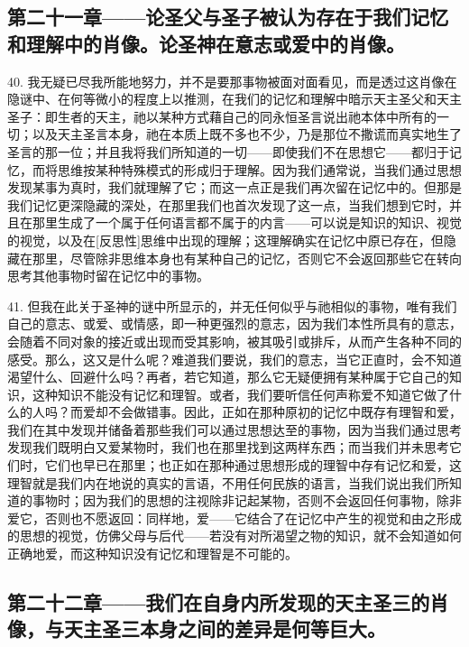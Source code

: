 
\subsection{第二十一章——论圣父与圣子被认为存在于我们记忆和理解中的肖像。论圣神在意志或爱中的肖像。}

40. 我无疑已尽我所能地努力，并不是要那事物被面对面看见，而是透过这肖像在隐谜中、在何等微小的程度上以推测，在我们的记忆和理解中暗示天主圣父和天主圣子：即生者的天主，祂以某种方式藉自己的同永恒圣言说出祂本体中所有的一切；以及天主圣言本身，祂在本质上既不多也不少，乃是那位不撒谎而真实地生了圣言的那一位；并且我将我们所知道的一切——即使我们不在思想它——都归于记忆，而将思维按某种特殊模式的形成归于理解。因为我们通常说，当我们通过思想发现某事为真时，我们就理解了它；而这一点正是我们再次留在记忆中的。但那是我们记忆更深隐藏的深处，在那里我们也首次发现了这一点，当我们想到它时，并且在那里生成了一个属于任何语言都不属于的内言——可以说是知识的知识、视觉的视觉，以及在[反思性]思维中出现的理解；这理解确实在记忆中原已存在，但隐藏在那里，尽管除非思维本身也有某种自己的记忆，否则它不会返回那些它在转向思考其他事物时留在记忆中的事物。\par

41. 但我在此关于圣神的谜中所显示的，并无任何似乎与祂相似的事物，唯有我们自己的意志、或爱、或情感，即一种更强烈的意志，因为我们本性所具有的意志，会随着不同对象的接近或出现而受其影响，被其吸引或排斥，从而产生各种不同的感受。那么，这又是什么呢？难道我们要说，我们的意志，当它正直时，会不知道渴望什么、回避什么吗？再者，若它知道，那么它无疑便拥有某种属于它自己的知识，这种知识不能没有记忆和理智。或者，我们要听信任何声称爱不知道它做了什么的人吗？而爱却不会做错事。因此，正如在那种原初的记忆中既存有理智和爱，我们在其中发现并储备着那些我们可以通过思想达至的事物，因为当我们通过思考发现我们既明白又爱某物时，我们也在那里找到这两样东西；而当我们并未思考它们时，它们也早已在那里；也正如在那种通过思想形成的理智中存有记忆和爱，这理智就是我们内在地说的真实的言语，不用任何民族的语言，当我们说出我们所知道的事物时；因为我们的思想的注视除非记起某物，否则不会返回任何事物，除非爱它，否则也不愿返回：同样地，爱——它结合了在记忆中产生的视觉和由之形成的思想的视觉，仿佛父母与后代——若没有对所渴望之物的知识，就不会知道如何正确地爱，而这种知识没有记忆和理智是不可能的。\par


\subsection{第二十二章——我们在自身内所发现的天主圣三的肖像，与天主圣三本身之间的差异是何等巨大。}

